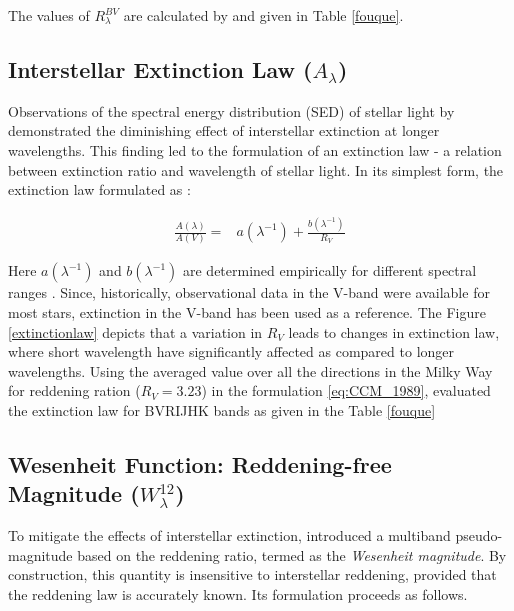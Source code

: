 The values of $R_\lambda^{BV}$ are calculated by \cite{2007fouque} and given in Table \ref{fouque}.

\subsection{Interstellar Extinction Law ($A_{\lambda}$)}




Observations of the spectral energy distribution (SED) of stellar light by \cite{1966Whiteoak} demonstrated the diminishing effect of interstellar extinction at longer wavelengths. This finding led to the formulation of an extinction law - a relation between extinction ratio and wavelength of stellar light. In its simplest form, the extinction law formulated as : 

\begin{align}\label{eq:CCM_1989}
	\frac{A(\lambda)}{A(V)} =& a(\lambda^{-1}) + \frac{b(\lambda^{-1})}{R_V} 
\end{align}

Here $a(\lambda^{-1})$ and $b(\lambda^{-1})$ are determined empirically for different spectral ranges \citep{1989cardelli}. Since, historically, observational data in the V-band were available for most stars, extinction in the V-band has been used as a reference. The Figure \ref{extinctionlaw} depicts that a variation in $R_V$ leads to changes in extinction law, where short wavelength have significantly affected as compared to longer wavelengths. Using the averaged value over all the directions in the Milky Way for reddening ration ($R_V = 3.23$) in the formulation \eqref{eq:CCM_1989}, \cite{2007fouque} evaluated the extinction law for BVRIJHK bands as given in the Table \ref{fouque}




\subsection{Wesenheit Function: Reddening-free Magnitude ($W_{\lambda}^{12}$)}

To mitigate the effects of interstellar extinction, \citet{1982madore} introduced a multiband pseudo-magnitude based on the reddening ratio, termed as the \emph{Wesenheit magnitude}. By construction, this quantity is insensitive to interstellar reddening, provided that the reddening law is accurately known. Its formulation proceeds as follows.

